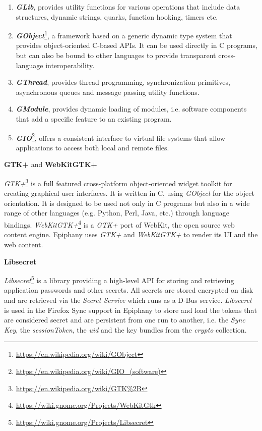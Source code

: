 \begin{enumerate}
  \item \textbf{\textit{GLib}}, provides utility functions for various operations that include data structures, dynamic strings, quarks, function hooking, timers etc.

  \item \textbf{\textit{GObject}}\footnote{\url{https://en.wikipedia.org/wiki/GObject}}, a framework based on a generic dynamic type system that provides object-oriented C-based APIs. It can be used directly in C programs, but can also be bound to other languages to provide transparent cross-language interoperability.

  \item \textbf{\textit{GThread}}, provides thread programming, synchronization primitives, asynchronous queues and message passing utility functions.

  \item \textbf{\textit{GModule}}, provides dynamic loading of modules, i.e. software components that add a specific feature to an existing program.

  \item \textbf{\textit{GIO}}\footnote{\url{https://en.wikipedia.org/wiki/GIO_(software)}}, offers a consistent interface to virtual file systems that allow applications to access both local and remote files.
\end{enumerate}

\textbf{GTK+} and \textbf{WebKitGTK+}

\textit{GTK+}\footnote{\url{https://en.wikipedia.org/wiki/GTK\%2B}} is a full featured cross-platform object-oriented widget toolkit for creating graphical user interfaces. It is written in C, using \textit{GObject} for the object orientation. It is designed to be used not only in C programs but also in a wide range of other languages (e.g. Python, Perl, Java, etc.) through language bindings. \textit{WebKitGTK+}\footnote{\url{https://wiki.gnome.org/Projects/WebKitGtk}} is a \textit{GTK+} port of WebKit, the open source web content engine. Epiphany uses \textit{GTK+} and \textit{WebKitGTK+} to render its UI and the web content.

\textbf{Libsecret}

\textit{Libsecret}\footnote{\url{https://wiki.gnome.org/Projects/Libsecret}} is a library providing a high-level API for storing and retrieving application passwords and other secrets. All secrets are stored encrypted on disk and are retrieved via the \textit{Secret Service} which runs as a D-Bus service. \textit{Libsecret} is used in the Firefox Sync support in Epiphany to store and load the tokens that are considered secret and are persistent from one run to another, i.e. the \textit{Sync Key}, the \textit{sessionToken}, the \textit{uid} and the key bundles from the \textit{crypto} collection.

